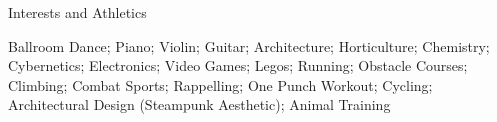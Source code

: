 \documentclass{resume} %
\begin{document}
\fi
\begin{rSection}{Interests and Athletics} \itemsep -3pt \vspace{-1.0em}
\item Ballroom Dance; Piano; Violin; Guitar; Architecture; Horticulture; Chemistry; Cybernetics; Electronics; Video Games; Legos; Running; Obstacle Courses; Climbing; Combat Sports; Rappelling; One Punch Workout; Cycling; Architectural Design (Steampunk Aesthetic); Animal Training

\end{rSection}

%
\end{document}
